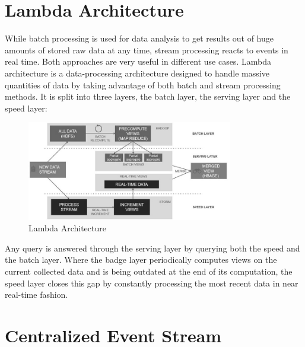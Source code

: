 \section{Lambda Architecture}
While batch processing is used for data analysis to get results out of huge
amounts of stored raw data at any time, stream processing reacts to events in
real time. Both approaches are very useful in different use cases. Lambda
architecture is a data-processing architecture designed to handle massive
quantities of data by taking advantage of both batch and stream processing
methods. It is split into three layers, the batch layer, the serving layer and
the speed layer:

\begin{figure}[H]
    \centering
    \includegraphics[width=0.8\textwidth]{images/lambda-architecture.jpg}
    \caption{Lambda Architecture}
    \label{fig:lambda-Architecture}
\end{figure}

Any query is answered through the serving layer by querying both the speed and
the batch layer. Where the badge layer periodically computes views on the
current collected data and is being outdated at the end of its computation, the
speed layer closes this gap by constantly processing the most recent data in
near real-time fashion. \cite{marz2015big} \cite{PrpSvyOfDSPS}

\section{Centralized Event Stream}
